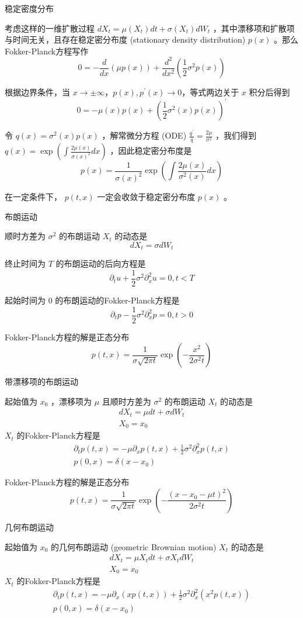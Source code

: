 稳定密度分布

考虑这样的一维扩散过程 $d X_t=\mu\left(X_t\right) d t+\sigma\left(X_t\right) d W_t$ ，其中漂移项和扩散项与时间无关，且存在稳定密分布度 (stationary density distribution) $p(x)$ 。那么Fokker-Planck方程写作
$$
0=-\frac{d}{d x}(\mu p(x))+\frac{d^2}{d x^2}\left(\frac{1}{2} \sigma^2 p(x)\right)
$$

根据边界条件，当 $x \rightarrow \pm\infty$，$p(x),p^{\prime}(x)\rightarrow0$，等式两边关于 $x$ 积分后得到
$$
0=-\mu(x) p(x)+\left(\frac{1}{2} \sigma^2(x) p(x)\right)^{\prime}
$$

令 $q(x)=\sigma^2(x) p(x)$ ，解常微分方程 (ODE) $\frac{q^{\prime}}{q}=\frac{2 \mu}{\sigma^2}$ ，我们得到 $q(x)=\exp \left(\int \frac{2 \mu(x)}{\sigma(x)^2} d x\right)$ ，因此稳定密分布度是
$$
p(x)=\frac{1}{\sigma(x)^2} \exp \left(\int \frac{2 \mu(x)}{\sigma^2(x)} d x\right)
$$

在一定条件下， $p(t, x)$ 一定会收敛于稳定密分布度 $p(x)$ 。

布朗运动

顺时方差为 $\sigma^2$ 的布朗运动 $X_t$ 的动态是
$$
d X_t=\sigma d W_t
$$

终止时间为 $T$ 的布朗运动的后向方程是
$$
\partial_t u+\frac{1}{2} \sigma^2 \partial_x^2 u=0, t<T
$$

起始时间为 0 的布朗运动的Fokker-Planck方程是
$$
\partial_t p-\frac{1}{2} \sigma^2 \partial_x^2 p=0, t>0
$$

Fokker-Planck方程的解是正态分布
$$
p(t, x)=\frac{1}{\sigma \sqrt{2 \pi t}} \exp \left(-\frac{x^2}{2 \sigma^2 t}\right)
$$

带漂移项的布朗运动

起始值为 $x_0$ ，漂移项为 $\mu$ 且顺时方差为 $\sigma^2$ 的布朗运动 $X_t$ 的动态是
$$
\begin{gathered}
d X_t=\mu d t+\sigma d W_t \\
X_0=x_0
\end{gathered}
$$
$X_t$ 的Fokker-Planck方程是
$$
\begin{gathered}
\partial_t p(t, x)=-\mu \partial_x p(t, x)+\frac{1}{2} \sigma^2 \partial_x^2 p(t, x) \\
p(0, x)=\delta\left(x-x_0\right)
\end{gathered}
$$

Fokker-Planck方程的解是正态分布
$$
p(t, x)=\frac{1}{\sigma \sqrt{2 \pi t}} \exp \left(-\frac{\left(x-x_0-\mu t\right)^2}{2 \sigma^2 t}\right)
$$

几何布朗运动

起始值为 $x_0$ 的几何布朗运动 (geometric Brownian motion) $X_t$ 的动态是
$$
\begin{gathered}
d X_t=\mu X_t d t+\sigma X_t d W_t \\
X_0=x_0
\end{gathered}
$$
$X_t$ 的Fokker-Planck方程是
$$
\begin{gathered}
\partial_t p(t, x)=-\mu \partial_x(x p(t, x))+\frac{1}{2} \sigma^2 \partial_x^2\left(x^2 p(t, x)\right) \\
p(0, x)=\delta\left(x-x_0\right)
\end{gathered}
$$

